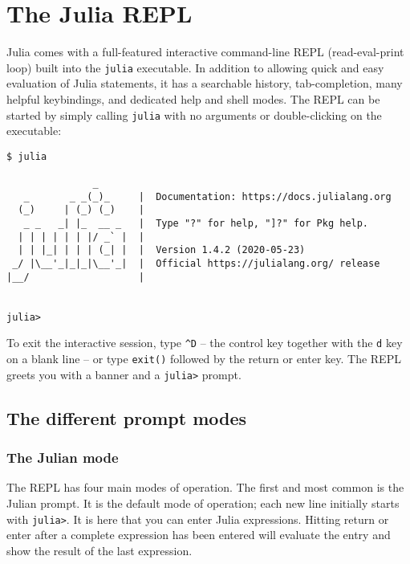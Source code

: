 \hypertarget{10948589284563697088}{}


\chapter{The Julia REPL}



Julia comes with a full-featured interactive command-line REPL (read-eval-print loop) built into the \texttt{julia} executable. In addition to allowing quick and easy evaluation of Julia statements, it has a searchable history, tab-completion, many helpful keybindings, and dedicated help and shell modes. The REPL can be started by simply calling \texttt{julia} with no arguments or double-clicking on the executable:




\begin{lstlisting}
$ julia

               _
   _       _ _(_)_     |  Documentation: https://docs.julialang.org
  (_)     | (_) (_)    |
   _ _   _| |_  __ _   |  Type "?" for help, "]?" for Pkg help.
  | | | | | | |/ _` |  |
  | | |_| | | | (_| |  |  Version 1.4.2 (2020-05-23)
 _/ |\__'_|_|_|\__'_|  |  Official https://julialang.org/ release
|__/                   |


julia>
\end{lstlisting}



To exit the interactive session, type \texttt{{\textasciicircum}D} – the control key together with the \texttt{d} key on a blank line – or type \texttt{exit()} followed by the return or enter key. The REPL greets you with a banner and a \texttt{julia>} prompt.



\hypertarget{3373315244675036651}{}


\section{The different prompt modes}



\hypertarget{3833232147615596628}{}


\subsection{The Julian mode}



The REPL has four main modes of operation. The first and most common is the Julian prompt. It is the default mode of operation; each new line initially starts with \texttt{julia>}. It is here that you can enter Julia expressions. Hitting return or enter after a complete expression has been entered will evaluate the entry and show the result of the last expression.




